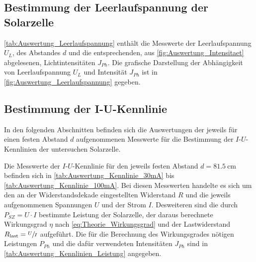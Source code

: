	
\subsection{Bestimmung der Leerlaufspannung der Solarzelle}
	
	\cref{tab:Auswertung_Leerlaufspannung} enthält die Messwerte der Leerlaufspannung $ U_{L} $,
	des Abstandes $ d $ und die entsprechenden, aus \cref{fig:Auswertung_Intensitaet} abgelesenen,
	Lichtintensitäten $ J_{Ph} $. Die grafische Darstellung der Abhängigkeit von Leerlaufspannung $ U_{L} $
	und Intensität $ J_{Ph} $ ist in \cref{fig:Auswertung_Leerlaufspannung} gegeben.


	
	
	
\subsection{Bestimmung der I-U-Kennlinie}
	In den folgenden Abschnitten befinden sich die Auswertungen der jeweils für
	einen festen Abstand $d$ aufgenommenen Messwerte für die Bestimmung der $I \text{-}U$-Kennlinien
	der untersuchen Solarzelle.  
	
	Die Messwerte der $I\text{-}U$-Kennlinie für den jeweils festen Abstand $d = \SI{81.5}{\cm}$
	befinden sich in \cref{tab:Auswertung_Kennlinie_30mA} bis \ref{tab:Auswertung_Kennlinie_100mA}.
    Bei diesen Messwerten handelte es
	sich um den an der Widerstandsdekade eingestellten Widerstand $R$ und die jeweils aufgenommenen 
	Spannungen $U$ und der Strom $I$. Desweiteren sind die durch $P_{SZ} = U \cdot I$ bestimmte
	Leistung der Solarzelle, der daraus berechnete Wirkungsgrad $\eta$ nach \cref{eq:Theorie_Wirkungsgrad} 
	und der Lastwiderstand $R_{\text{last}} = \sfrac{U}{I}$ aufgeführt.
	Die für die Berechnung des Wirkungsgrades nötigen Leistungen $P_{Ph}$ und die dafür verwendeten 
	Intensitäten $J_{Ph}$ sind in \cref{tab:Auswertung_Kennlinien_Leistung} angegeben.   
	



		
		
		
		
		
 
